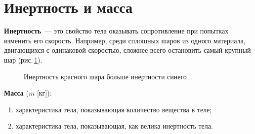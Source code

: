 \documentclass[main.tex]{subfiles}
\begin{document}



\pagestyle{empty}

 

\setcounter{section}{15
}
\addtocounter{section}{-1} 

\section{Инертность и масса}


\textbf{Инертность}~--- это свойство тела оказывать сопротивление при попытках изменить его скорость. Например, среди сплошных шаров из одного материала, двигающихся с одинаковой скоростью, сложнее всего остановить самый крупный шар (рис.\,\ref{fig:p29}).  

    \begin{figure}[H]
    \centering

\caption{Инертность красного шара больше инертности синего}
\label{fig:p29}
\end{figure}

\textbf{Масса} ($m$ [кг]):
\begin{enumerate}
    \item [1)] характеристика тела, показывающая количество вещества в теле; 
    \item [2)] характеристика тела, показывающая, как велика инертность тела.
\end{enumerate}
\end{document}
